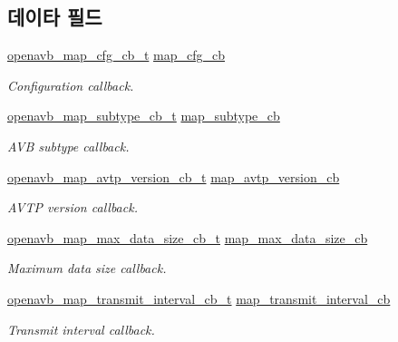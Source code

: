 \subsection*{데이타 필드}
\begin{DoxyCompactItemize}
\item 
\hyperlink{include_2openavb__map__pub_8h_ae520155920b8a6dcf999055a6d00aabd}{openavb\+\_\+map\+\_\+cfg\+\_\+cb\+\_\+t} \hyperlink{structopenavb__map__cb__t_aa88869f419f2830bcbfe2646b0efb2fc}{map\+\_\+cfg\+\_\+cb}
\begin{DoxyCompactList}\small\item\em Configuration callback. \end{DoxyCompactList}\item 
\hyperlink{include_2openavb__map__pub_8h_a1db6afa1f3199fa53dd1436a18e5ea0c}{openavb\+\_\+map\+\_\+subtype\+\_\+cb\+\_\+t} \hyperlink{structopenavb__map__cb__t_aa3fdb0836d9178ec32d124b7c3d614e9}{map\+\_\+subtype\+\_\+cb}
\begin{DoxyCompactList}\small\item\em A\+VB subtype callback. \end{DoxyCompactList}\item 
\hyperlink{include_2openavb__map__pub_8h_a11f55e589002ef367609dada85560780}{openavb\+\_\+map\+\_\+avtp\+\_\+version\+\_\+cb\+\_\+t} \hyperlink{structopenavb__map__cb__t_a185e195210352d990db73d5ed37b5533}{map\+\_\+avtp\+\_\+version\+\_\+cb}
\begin{DoxyCompactList}\small\item\em A\+V\+TP version callback. \end{DoxyCompactList}\item 
\hyperlink{include_2openavb__map__pub_8h_a81a77c014c4322c3348c780bc0f2c9da}{openavb\+\_\+map\+\_\+max\+\_\+data\+\_\+size\+\_\+cb\+\_\+t} \hyperlink{structopenavb__map__cb__t_ac87069ceed64005bb4a3c8fbb3da8357}{map\+\_\+max\+\_\+data\+\_\+size\+\_\+cb}
\begin{DoxyCompactList}\small\item\em Maximum data size callback. \end{DoxyCompactList}\item 
\hyperlink{include_2openavb__map__pub_8h_ad0bb22131f5da3fa07a43cf4b6fe3bab}{openavb\+\_\+map\+\_\+transmit\+\_\+interval\+\_\+cb\+\_\+t} \hyperlink{structopenavb__map__cb__t_a9928a7e0cddbaebed6cb1333e270acf3}{map\+\_\+transmit\+\_\+interval\+\_\+cb}
\begin{DoxyCompactList}\small\item\em Transmit interval callback. \end{DoxyCompactList}\item 

\end{DoxyCompactItemize}
